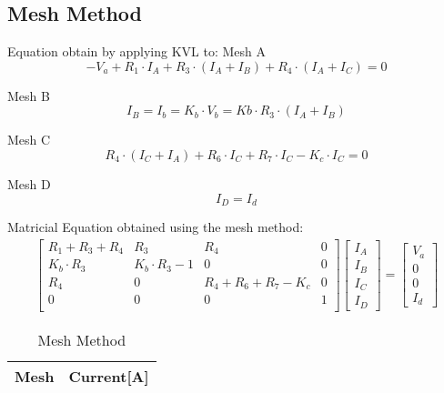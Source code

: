 		
\subsection{Mesh Method}

Equation obtain by applying KVL to:
Mesh A
\begin{equation}
  -V_a+ R_1\cdot I_A + R_3 \cdot (I_A+I_B)+ R_4 \cdot (I_A+I_C) =0
  \label{eq:kvl}
\end{equation}

Mesh B
\begin{equation}
  I_B = I_b = K_b \cdot V_b = Kb \cdot R_3 \cdot (I_A + I_B)
  \label{eq:kvl2}
\end{equation}

Mesh C
\begin{equation}
  R_4 \cdot (I_C + I_A) + R_6 \cdot I_C + R_7 \cdot I_C - K_c \cdot I_C = 0
  \label{eq:kvl3}
\end{equation}

Mesh D
\begin{equation}
  I_D =I_d
  \label{eq:kvl4}
\end{equation}

Matricial Equation obtained using the mesh method:
\begin{gather}
	\begin{bmatrix}
		R_1 + R_3 + R_4 & R_3 & R_4 & 0  \\
		K_b \cdot R_3 & K_b \cdot R_3 - 1& 0 & 0 \\
		R_4 & 0 & R_4 + R_6 + R_ 7 - K_c & 0 \\
		0 & 0 & 0 & 1 \\
	\end{bmatrix}
	\begin {bmatrix} I_A \\ I_B \\ I_C \\ I_D \end{bmatrix}
	=
	\begin {bmatrix} V_a \\ 0 \\ 0 \\ I_d \end{bmatrix}
\end{gather}

  
\begin{table}[h]
  \centering
  \begin{tabular}{|l|r|}
    \hline    
    {\bf Mesh} & {\bf Current[A]} \\ \hline
    
  \end{tabular}
  \caption{Mesh Method}
  \label{tab:mesh}
\end{table}


